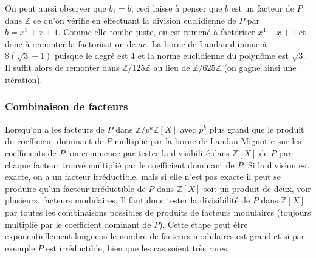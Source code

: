 \documentclass[a4paper,11pt]{article}
\begin{document}
\begin{giacjshere}
On peut aussi observer que $b_1=b$, ceci laisse à penser que $b$ est 
un facteur de $P$ dans $\mathbb{Z}$ ce qu'on vérifie en effectuant la
division euclidienne de $P$ par $b=x^3+x+1$. Comme elle tombe
juste, on est ramené à factoriser $x^4-x+1$ et donc à remonter
la factorisation de $ac$. La borne de Landau diminue à $8(\sqrt{3}+1)$
puisque le degré est 4 et la norme euclidienne du polynôme est $\sqrt{3}$.
Il suffit alors de remonter dans $\mathbb{Z}/125 \mathbb{Z}$ au lieu de $\mathbb{Z}/625 \mathbb{Z}$
(on gagne ainsi une itération).

\subsubsection{Combinaison de facteurs}
Lorsqu'on a les facteurs de $P$ dans $\mathbb{Z}/p^k\mathbb{Z}[X]$ avec $p^k$ plus grand
que le produit du coefficient dominant de $P$ multiplié par la borne
de Landau-Mignotte sur les coefficients de $P$, on commence par
tester la divisibilité dans $\mathbb{Z}[X]$ de $P$ par chaque facteur trouvé
multiplié par le coefficient dominant de $P$. Si la division est
exacte, on a un facteur irréductible, mais si elle n'est pas exacte
il peut se produire qu'un facteur irréductible de $P$ dans $\mathbb{Z}[X]$ soit un
produit de deux, voir plusieurs, facteurs modulaires. Il faut
donc tester la divisibilité de $P$ dans $\mathbb{Z}[X]$ par toutes les combinaisons 
possibles de produits de facteurs modulaires (toujours multiplié par
le coefficient dominant de $P$). Cette étape peut être exponentiellement
longue si le nombre de facteurs modulaires est grand et si par
exemple $P$ est irréductible, bien que les cas soient très rares. 


\end{giacjshere}
\end{document}
